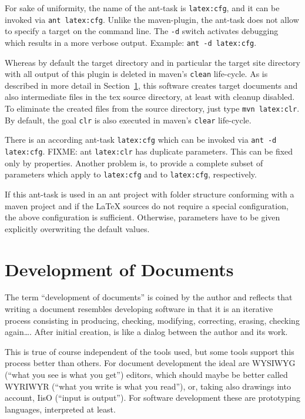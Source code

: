 For sake of uniformity, 
the name of the ant-task is \texttt{latex:cfg}, 
and it can be invoked via \texttt{ant latex:cfg}. 
Unlike the maven-plugin, the ant-task 
does not allow to specify a target on the command line. 
The \texttt{-d} switch activates debugging 
which results in a more verbose output. 
Example: \texttt{ant -d latex:cfg}. 

Whereas by default the target directory and in particular 
the target site directory with all output of this plugin is deleted 
in maven's \texttt{clean} life-cycle. 
As is described in more detail in Section~\ref{sec:devel}, 
this software creates target documents and also intermediate files 
in the tex source directory, at least with cleanup disabled. 
To eliminate the created files from the source directory, 
just type \texttt{mvn latex:clr}. 
By default, the goal \texttt{clr} 
is also executed in maven's \texttt{clear} life-cycle. 

There is an according ant-task \texttt{latex:cfg} 
which can be invoked via \texttt{ant -d latex:cfg}. 
FIXME\@: ant  \texttt{latex:clr} has duplicate parameters. 
This can be fixed only by properties. 
Another problem is, to provide a complete subset of parameters 
which apply to \texttt{latex:cfg} and to \texttt{latex:cfg}, respectively. 

If this ant-task is used in an ant project 
with folder structure conforming with a maven project 
and if the \LaTeX{} sources do not require a special configuration, 
the above configuration is sufficient. 
Otherwise, parameters have to be given explicitly 
overwriting the default values. 

\section{Development of Documents}\label{sec:devel}

The term ``development of documents'' is coined by the author 
and reflects that writing a document 
resembles developing software 
in that it is an iterative process consisting in producing, 
checking, modifying, correcting, erasing, checking again\dots. 
After initial creation, is like a dialog between the author and its work. 

This is true of course independent of the tools used, 
but some tools support this process better than others. 
For document development the ideal are WYSIWYG (``what you see is what you get'') editors, 
which should maybe be better called WYRIWYR (``what you write is what you read''), 
or, taking also drawings into account, IisO (``input is output''). %
For software development these are prototyping languages, interpreted at least. 

